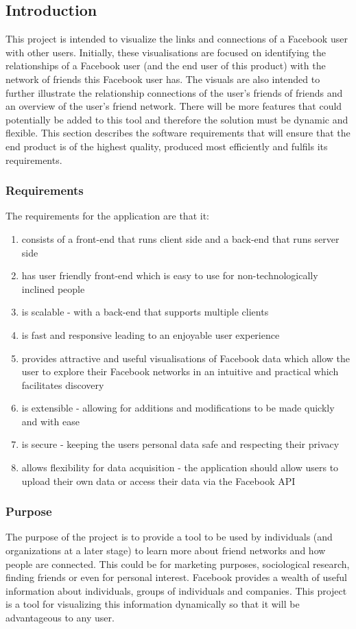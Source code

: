 \documentclass[12pt,onecolumn]{article}
\begin{document}
	\subsection{Introduction}
	This project is intended to visualize the links and connections of a Facebook user with other users. Initially, these visualisations are focused on identifying the relationships of a Facebook user (and the end user of this product) with the network of friends this Facebook user has. The visuals are also intended to further illustrate the relationship connections of the user's friends of friends and an overview of the user's friend network. There will be more features that could potentially be added to this tool and therefore the solution must be dynamic and flexible. This section describes the software requirements that will ensure that the end product is of the highest quality, produced most efficiently and fulfils its requirements.
	
	\subsubsection{Requirements}
	
	The requirements for the application are that it:
	\begin{enumerate}
		\item consists of a front-end that runs client side and a back-end that runs server side 
		\item has user friendly front-end which is easy to use for non-technologically inclined people
		\item is scalable - with a back-end that supports multiple clients
		\item is fast and responsive leading to an enjoyable user experience
		\item provides attractive and useful visualisations of Facebook data which allow the user to explore their Facebook networks in an intuitive and practical which facilitates discovery
		\item is extensible - allowing for additions and modifications to be made quickly and with ease
		\item is secure - keeping the users personal data safe and respecting their privacy
		\item allows flexibility for data acquisition - the application should allow users to upload their own data or access their data via the Facebook API
	\end{enumerate}
	
	\subsubsection{Purpose}
	The purpose of the project is to provide a tool to be used by individuals (and organizations at a later stage) to learn more about friend networks and how people are connected. This could be for marketing purposes, sociological research, finding friends or even for personal  interest. Facebook provides a wealth of useful information about individuals, groups of individuals and companies. This project is a tool for visualizing this information dynamically so that it will be advantageous to any  user.
	
\end{document}
